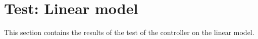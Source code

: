 \section{Test: Linear model}
This section contains the results of the test of the controller on the linear model.